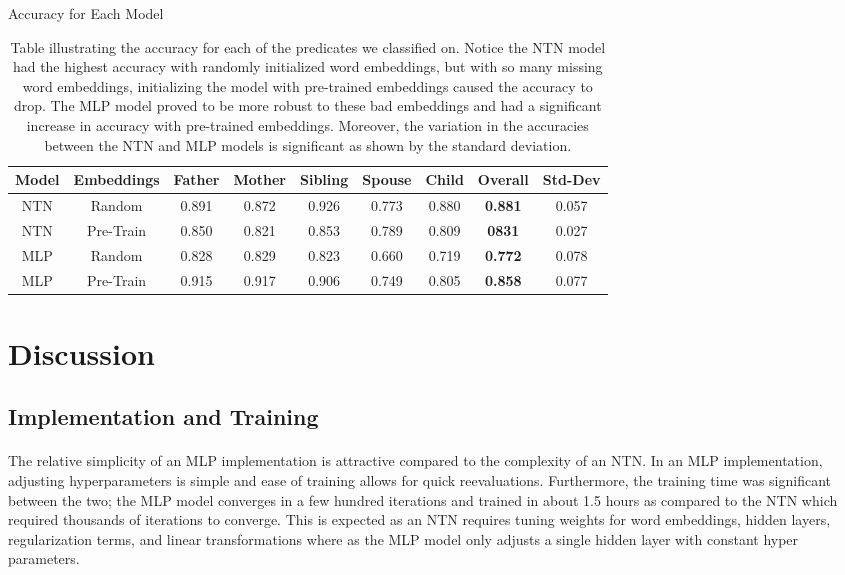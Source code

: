 \documentclass[11.5pt]{article}
\begin{document}
 \begin{table}[h!]
\begin{center}
\begin{large}
Accuracy for Each Model
\end{large}
\begin{tabular}{|cc|ccccc||cc|}
\hline
\textbf{Model} & \textbf{Embeddings} & \textbf{Father} & \textbf{Mother} & \textbf{Sibling} & \textbf{Spouse} & \textbf{Child} & \textbf{ Overall} & \textbf{Std-Dev}\\
\hline
NTN & Random 		&	0.891 	& 0.872 	& 0.926	&	0.773	&  0.880	& \textbf{0.881}	 & 0.057	\\
NTN & Pre-Train 		&	0.850 	& 0.821 	&	0.853	& 0.789	& 0.809 	& \textbf{0831}	& 0.027	\\

MLP & Random 		& 0.828 & 0.829 & 0.823 & 0.660 & 0.719 &  \textbf{0.772}	& 0.078	\\
MLP & Pre-Train 		& 0.915 & 0.917 & 0.906 & 0.749 & 0.805 & \textbf{0.858}	& 0.077	\\
\hline
\end{tabular}
\end{center}
  \caption{\small Table illustrating the accuracy for each of the predicates we classified on. Notice the NTN model had the highest accuracy with randomly initialized word embeddings, but with so many missing word embeddings, initializing the model with pre-trained embeddings caused the accuracy to drop. The MLP model proved to be more robust to these bad embeddings and had a significant increase in accuracy with pre-trained embeddings.  Moreover, the variation in the accuracies between the NTN and MLP models is significant as shown by the standard deviation. }
  \label{accuracy}
\end{table}


\section{Discussion}

\subsection{Implementation and Training}
\paragraph{} The relative simplicity of an MLP implementation is attractive compared to the complexity of an NTN. In an MLP implementation, adjusting hyperparameters is simple and ease of training allows for quick reevaluations. Furthermore, the training time was significant between the two; the MLP model converges in a few hundred iterations and trained in about 1.5 hours as compared to the NTN which required thousands of iterations to converge. This is expected as an NTN requires tuning weights for word embeddings, hidden layers, regularization terms, and linear transformations where as the MLP model only adjusts a single hidden layer with constant hyper parameters.
\end{document}
